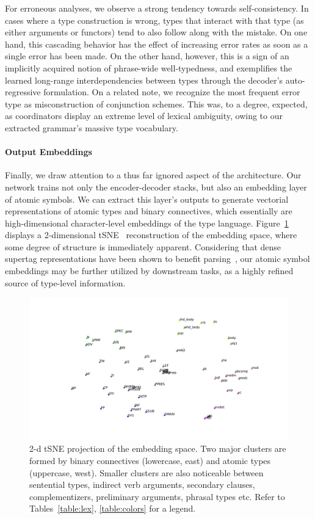 For erroneous analyses, we observe a strong tendency towards self-consistency.
In cases where a type construction is wrong, types that interact with that type (as either arguments or functors) tend to also follow along with the mistake.
On one hand, this cascading behavior has the effect of increasing error rates as soon as a single error has been made.
On the other hand, however, this is a sign of an implicitly acquired notion of phrase-wide well-typedness, and exemplifies the learned long-range interdependencies between types through the decoder's auto-regressive formulation.
On a related note, we recognize the most frequent error type as misconstruction of conjunction schemes. 
This was, to a degree, expected, as coordinators display an extreme level of lexical ambiguity, owing to our extracted grammar's massive type vocabulary. 

\paragraph{Output Embeddings}
Finally, we draw  attention to a thus far ignored aspect of the architecture. 
Our network trains not only the encoder-decoder stacks, but also an embedding layer of atomic symbols.
We can extract this layer's outputs to generate vectorial representations of atomic types and binary connectives, which essentially are high-dimensional character-level embeddings of the type language.
Figure~\ref{fig:symbol_tsne} displays a 2-dimensional tSNE~\cite{maaten2008visualizing} reconstruction of the embedding space, where some degree of structure is immediately apparent.
Considering that dense supertag representations have been shown to benefit parsing~\cite{kasai-etal-2017-tag}, our atomic symbol embeddings may be further utilized by downstream tasks, as a highly refined source of type-level information.

\begin{figure}[t]
    \centering
    \hspace{-70pt}
    \includegraphics[scale=0.29]{Figures/cluster.pdf}
    \caption[tSNE of Atomic Symbol Embeddings]{2-d tSNE projection of the embedding space. Two major clusters are formed by binary connectives (lowercase, east) and atomic types (uppercase, west). Smaller clusters are also noticeable between sentential types, indirect verb arguments, secondary clauses, complementizers, preliminary arguments, phrasal types etc. Refer to Tables~\ref{table:lex}, \ref{table:colors} for a legend.}
    \label{fig:symbol_tsne}
\end{figure}


